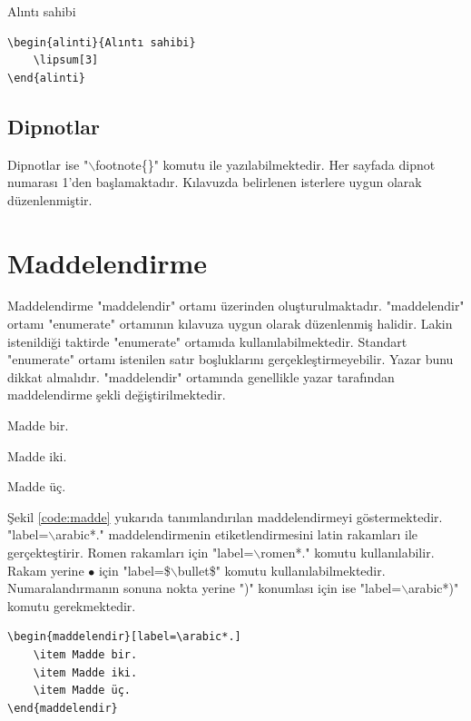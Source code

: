 \begin{alinti}{Alıntı sahibi}
	\lipsum[3]
\end{alinti}

\begin{lstlisting}[language={[LaTeX]{TeX}}, label=code:alinti, caption=Örnek alıntı yazımı]
\begin{alinti}{Alıntı sahibi}
	\lipsum[3]
\end{alinti}
\end{lstlisting}

\section{Dipnotlar}
Dipnotlar ise "$\backslash$footnote\{\}" komutu ile yazılabilmektedir. Her sayfada dipnot numarası 1'den başlamaktadır. Kılavuzda belirlenen isterlere uygun olarak düzenlenmiştir.


\chapter{Maddelendirme}
\label{ch:madde}
Maddelendirme "maddelendir" ortamı üzerinden oluşturulmaktadır. "maddelendir" ortamı "enumerate" ortamının kılavuza uygun olarak düzenlenmiş halidir. Lakin istenildiği taktirde "enumerate" ortamıda kullanılabilmektedir. Standart "enumerate" ortamı istenilen satır boşluklarını gerçekleştirmeyebilir. Yazar bunu dikkat almalıdır. "maddelendir" ortamında genellikle yazar tarafından maddelendirme şekli değiştirilmektedir. 

\begin{maddelendir}[label=\arabic*.]
	\item Madde bir.
	\item Madde iki.
	\item Madde üç.
\end{maddelendir}

Şekil \ref{code:madde} yukarıda tanımlandırılan maddelendirmeyi göstermektedir. "label=$\backslash$arabic*." maddelendirmenin etiketlendirmesini latin rakamları ile gerçekteştirir. Romen rakamları için  "label=$\backslash$romen*." komutu kullanılabilir. Rakam yerine $\bullet$ için "label=\$$\backslash$bullet\$" komutu kullanılabilmektedir. Numaralandırmanın sonuna nokta yerine ")" konumlası için ise  "label=$\backslash$arabic*)" komutu gerekmektedir.

\begin{lstlisting}[language={[LaTeX]{TeX}}, label=code:madde, caption=Örnek maddelendirme]
\begin{maddelendir}[label=\arabic*.]
	\item Madde bir.
	\item Madde iki.
	\item Madde üç.
\end{maddelendir}
\end{lstlisting}



